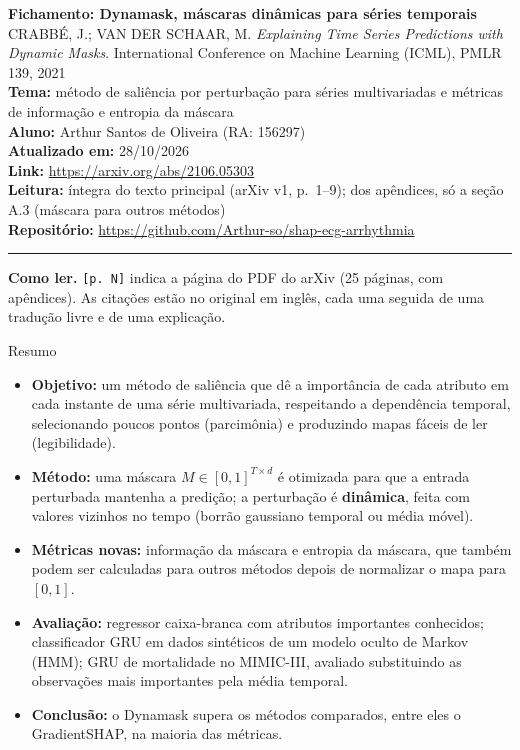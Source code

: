 \documentclass[11pt,a4paper]{article}
\begin{document}
\sloppy

\begin{center}
    {\LARGE \textbf{Fichamento: Dynamask, máscaras dinâmicas para séries temporais}} \\[0.35em]
    {\large CRABBÉ, J.; VAN DER SCHAAR, M. \textit{Explaining Time Series Predictions with Dynamic Masks}. International Conference on Machine Learning (ICML), PMLR 139, 2021} \\[0.3em]
    \textbf{Tema:} método de saliência por perturbação para séries multivariadas e métricas de informação e entropia da máscara \\[0.2em]
    \textbf{Aluno:} Arthur Santos de Oliveira (RA: 156297) \\[0.2em]
    \textbf{Atualizado em:} 28/10/2026 \\[0.2em]
    \textbf{Link:} \url{https://arxiv.org/abs/2106.05303} \\[0.2em]
    \textbf{Leitura:} íntegra do texto principal (arXiv v1, p.~1--9); dos apêndices, só a seção A.3 (máscara para outros métodos) \\[0.2em]
    \textbf{Repositório:} \url{https://github.com/Arthur-so/shap-ecg-arrhythmia}
\end{center}
\vspace{-0.5em}
\hrule
\vspace{0.8em}

\textbf{Como ler.} \texttt{[p. N]} indica a página do PDF do arXiv (25 páginas, com apêndices). As citações estão no original em inglês, cada uma seguida de uma tradução livre e de uma explicação.

\begin{infobox}[note]{Resumo}
\begin{itemize}
\item \textbf{Objetivo:} um método de saliência que dê a importância de cada atributo em cada instante de uma série multivariada, respeitando a dependência temporal, selecionando poucos pontos (parcimônia) e produzindo mapas fáceis de ler (legibilidade).
\item \textbf{Método:} uma máscara $M \in [0,1]^{T \times d}$ é otimizada para que a entrada perturbada mantenha a predição; a perturbação é \textbf{dinâmica}, feita com valores vizinhos no tempo (borrão gaussiano temporal ou média móvel).
\item \textbf{Métricas novas:} informação da máscara e entropia da máscara, que também podem ser calculadas para outros métodos depois de normalizar o mapa para $[0,1]$.
\item \textbf{Avaliação:} regressor caixa-branca com atributos importantes conhecidos; classificador GRU em dados sintéticos de um modelo oculto de Markov (HMM); GRU de mortalidade no MIMIC-III, avaliado substituindo as observações mais importantes pela média temporal.
\item \textbf{Conclusão:} o Dynamask supera os métodos comparados, entre eles o GradientSHAP, na maioria das métricas.
\end{itemize}
\end{infobox}
\end{document}
